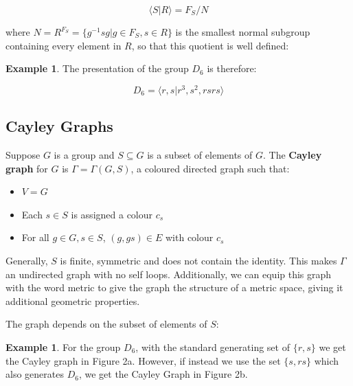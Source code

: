 \documentclass[10pt]{article}
\theoremstyle{plain}
\theoremstyle{definition}
\newtheorem{example}[theorem]{Example}
\theoremstyle{definition}
\theoremstyle{definition}
\begin{document}
\begin{multicols}{2}
$$ \langle S | R \rangle = F_S / N $$

where $N = R^{F_S} = \{ g^{-1} s g | g \in F_S, s \in R \}$ is the smallest normal subgroup containing every element in $R$, so that this quotient is well defined:

\begin{example}
	The presentation of the group $D_6$ is therefore:

	$$ D_6 = \langle r, s | r^3, s^2, rsrs \rangle $$
\end{example}

\subsection{Cayley Graphs}

Suppose $G$ is a group and $S \subseteq G$ is a subset of elements of $G$. The \textbf{Cayley graph} for $G$ is $\Gamma = \Gamma(G, S)$, a coloured directed graph such that:

\begin{itemize}
	\setlength\itemsep{-0.3em}
	\item $V = G$
	\item Each $s \in S$ is assigned a colour $c_s$
	\item For all $g \in G, s \in S$, $(g, gs) \in E$ with colour $c_s$
\end{itemize}

Generally, $S$ is finite, symmetric and does not contain the identity. This makes $\Gamma$ an undirected graph with no self loops. Additionally, we can equip this graph with the word metric to give the graph the structure of a metric space, giving it additional geometric properties.

The graph depends on the subset of elements of $S$:

\begin{example}
	For the group $D_6$, with the standard generating set of $\{ r, s \}$ we get the Cayley graph in Figure 2a. However, if instead we use the set $\{ s, rs \}$ which also generates $D_6$, we get the Cayley Graph in Figure 2b.


\end{example}
\end{multicols}
\end{document}
